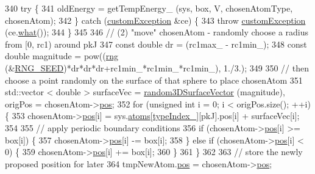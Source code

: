 \begin{DoxyCode}
340             \textcolor{keywordflow}{try} \{
341                 oldEnergy = getTempEnergy\_ (sys, box, V, chosenAtomType, chosenAtom);
342             \} \textcolor{keywordflow}{catch} (\hyperlink{classcustom_exception}{customException} &ce) \{
343                     \textcolor{keywordflow}{throw} \hyperlink{classcustom_exception}{customException} (ce.\hyperlink{classcustom_exception_aeb6ab5848b038adfc68fde86a512f691}{what}());
344             \}
345 
346             \textcolor{comment}{// (2) "move" chosenAtom - randomly choose a radius from [0, rc1) around pkJ}
347             \textcolor{keyword}{const} \textcolor{keywordtype}{double} dr = (rc1max\_ - rc1min\_);
348         \textcolor{keyword}{const} \textcolor{keywordtype}{double} magnitude = pow((\hyperlink{utilities_8cpp_a0f9542af4b475ac79cb679d7a8d14db0}{rng} (&\hyperlink{global_8h_a3f4e4ea24d5a5c66feae55d1f329c884}{RNG\_SEED})*dr*dr*dr+rc1min\_*rc1min\_*rc1min\_), 1./3.);
349 
350             \textcolor{comment}{// then choose a point randomly on the surface of that sphere to place chosenAtom}
351             std::vector < double > surfaceVec = \hyperlink{utilities_8cpp_af1bc480936b7436d4e679abc5a837815}{random3DSurfaceVector} (magnitude), 
      origPos = chosenAtom->\hyperlink{classatom_a3ae5f4880e7831d8b2c9fda72b4eb24a}{pos};
352             \textcolor{keywordflow}{for} (\textcolor{keywordtype}{unsigned} \textcolor{keywordtype}{int} i = 0; i < origPos.size(); ++i) \{
353                 chosenAtom->\hyperlink{classatom_a3ae5f4880e7831d8b2c9fda72b4eb24a}{pos}[i] = sys.\hyperlink{classsim_system_a90421b19082f7fb8fc23b7264b1161e4}{atoms}[\hyperlink{classmc_move_acb731965547b0326ef318ec96da8b46a}{typeIndex\_}][pkJ].pos[i] + surfaceVec[i];
354 
355                 \textcolor{comment}{// apply periodic boundary conditions}
356                 \textcolor{keywordflow}{if} (chosenAtom->\hyperlink{classatom_a3ae5f4880e7831d8b2c9fda72b4eb24a}{pos}[i] >= box[i]) \{
357                         chosenAtom->\hyperlink{classatom_a3ae5f4880e7831d8b2c9fda72b4eb24a}{pos}[i] -= box[i];
358                     \} \textcolor{keywordflow}{else} \textcolor{keywordflow}{if} (chosenAtom->\hyperlink{classatom_a3ae5f4880e7831d8b2c9fda72b4eb24a}{pos}[i] < 0) \{
359                         chosenAtom->\hyperlink{classatom_a3ae5f4880e7831d8b2c9fda72b4eb24a}{pos}[i] += box[i];
360                     \}
361             \}
362 
363             \textcolor{comment}{// store the newly proposed position for later}
364             tmpNewAtom.\hyperlink{classatom_a3ae5f4880e7831d8b2c9fda72b4eb24a}{pos} = chosenAtom->\hyperlink{classatom_a3ae5f4880e7831d8b2c9fda72b4eb24a}{pos};

\end{DoxyCode}

